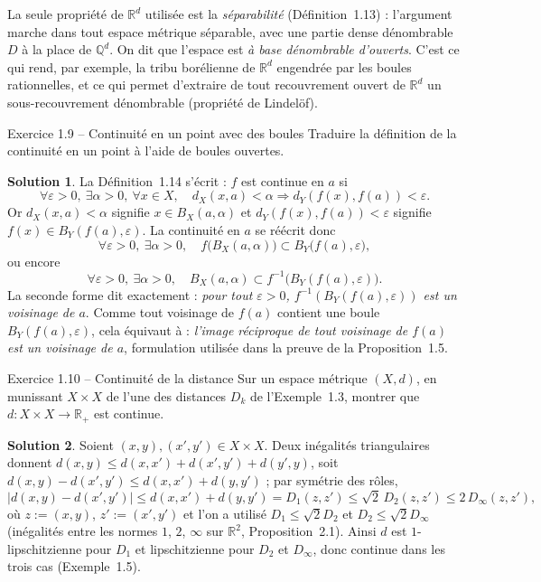 \documentclass[11pt,a4paper]{article}
\newcommand{\R}{\mathbb{R}}
\newcommand{\Q}{\mathbb{Q}}
\newcommand{\abs}[1]{\left|#1\right|}
\theoremstyle{definition}
\newtheorem*{solution}{Solution}
\begin{document}
\begin{pointcle}
La seule propriété de $\R^d$ utilisée est la \emph{séparabilité} (Définition~1.13) : l'argument marche dans tout espace métrique séparable, avec une partie dense dénombrable $D$ à la place de $\Q^d$. On dit que l'espace est \emph{à base dénombrable d'ouverts}. C'est ce qui rend, par exemple, la tribu borélienne de $\R^d$ engendrée par les boules rationnelles, et ce qui permet d'extraire de tout recouvrement ouvert de $\R^d$ un sous-recouvrement dénombrable (propriété de Lindelöf).
\end{pointcle}

\begin{exo}{Exercice 1.9 -- Continuité en un point avec des boules}
Traduire la définition de la continuité en un point à l'aide de boules ouvertes.
\end{exo}

\begin{solution}
La Définition~1.14 s'écrit : $f$ est continue en $a$ si
\[
\forall\varepsilon>0,\ \exists\alpha>0,\ \forall x\in X,\quad d_X(x,a)<\alpha\Rightarrow d_Y(f(x),f(a))<\varepsilon .
\]
Or $d_X(x,a)<\alpha$ signifie $x\in B_X(a,\alpha)$ et $d_Y(f(x),f(a))<\varepsilon$ signifie $f(x)\in B_Y(f(a),\varepsilon)$. La continuité en $a$ se réécrit donc
\[
\forall\varepsilon>0,\ \exists\alpha>0,\quad f\big(B_X(a,\alpha)\big)\subset B_Y\big(f(a),\varepsilon\big),
\]
ou encore
\[
\forall\varepsilon>0,\ \exists\alpha>0,\quad B_X(a,\alpha)\subset f^{-1}\big(B_Y(f(a),\varepsilon)\big).
\]
La seconde forme dit exactement : \emph{pour tout $\varepsilon>0$, $f^{-1}(B_Y(f(a),\varepsilon))$ est un voisinage de $a$}. Comme tout voisinage de $f(a)$ contient une boule $B_Y(f(a),\varepsilon)$, cela équivaut à : \emph{l'image réciproque de tout voisinage de $f(a)$ est un voisinage de $a$}, formulation utilisée dans la preuve de la Proposition~1.5.
\end{solution}

\begin{exo}{Exercice 1.10 -- Continuité de la distance}
Sur un espace métrique $(X,d)$, en munissant $X\times X$ de l'une des distances $D_k$ de l'Exemple~1.3, montrer que $d:X\times X\to\R_+$ est continue.
\end{exo}

\begin{solution}
Soient $(x,y),(x',y')\in X\times X$. Deux inégalités triangulaires donnent $d(x,y)\le d(x,x')+d(x',y')+d(y',y)$, soit $d(x,y)-d(x',y')\le d(x,x')+d(y,y')$ ; par symétrie des rôles,
\[
\abs{d(x,y)-d(x',y')}\le d(x,x')+d(y,y')=D_1(z,z')\le\sqrt2\,D_2(z,z')\le2\,D_\infty(z,z'),
\]
où $z:=(x,y)$, $z':=(x',y')$ et
l'on a utilisé $D_1\le\sqrt2D_2$ et $D_2\le\sqrt2D_\infty$ (inégalités entre les normes $1$, $2$, $\infty$ sur $\R^2$, Proposition~2.1). Ainsi $d$ est $1$-lipschitzienne pour $D_1$ et lipschitzienne pour $D_2$ et $D_\infty$, donc continue dans les trois cas (Exemple~1.5).
\end{solution}
\end{document}
